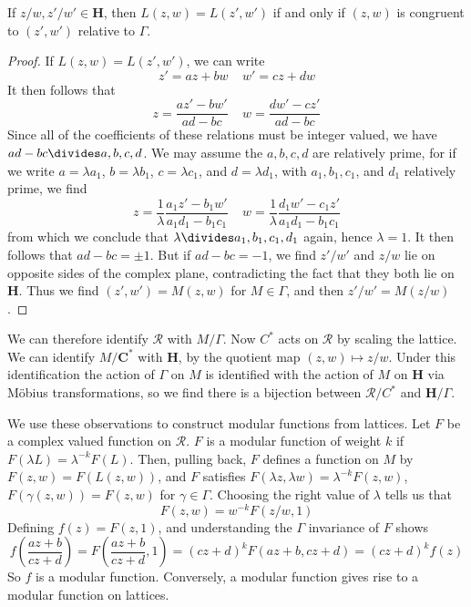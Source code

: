 \begin{theorem}
    If $z/w, z'/w' \in \mathbf{H}$, then $L(z,w) = L(z',w')$ if and only if $(z,w)$ is congruent to $(z',w')$ relative to $\Gamma$.
\end{theorem}
\begin{proof}
    If $L(z,w) = L(z',w')$, we can write
    \[ z' = az + bw\ \ \ \ \ w' = cz + dw \]
    It then follows that
    \[ z = \frac{az' - bw'}{ad - bc}\ \ \ \ \ w = \frac{dw' - cz'}{ad-bc} \]
    Since all of the coefficients of these relations must be integer valued, we have $ad - bc \divides a,b,c,d$. We may assume the $a,b,c,d$ are relatively prime, for if we write $a = \lambda a_1$, $b = \lambda b_1$, $c = \lambda c_1$, and $d = \lambda d_1$, with $a_1, b_1, c_1$, and $d_1$ relatively prime, we find
    \[ z = \frac{1}{\lambda} \frac{a_1 z' - b_1 w'}{a_1 d_1 - b_1 c_1} \ \ \ \ \ w =  \frac{1}{\lambda} \frac{d_1 w' - c_1 z'}{a_1 d_1 - b_1 c_1} \]
    from which we conclude that $\lambda \divides a_1, b_1, c_1, d_1$ again, hence $\lambda = 1$. It then follows that $ad - bc = \pm 1$. But if $ad - bc = -1$, we find $z'/w'$ and $z/w$ lie on opposite sides of the complex plane, contradicting the fact that they both lie on $\mathbf{H}$. Thus we find $(z',w') = M(z,w)$ for $M \in \Gamma$, and then $z'/w' = M(z/w)$.
\end{proof}

We can therefore identify $\mathcal{R}$ with $M/\Gamma$. Now $C^*$ acts on $\mathcal{R}$ by scaling the lattice. We can identify $M/\mathbf{C}^*$ with $\mathbf{H}$, by the quotient map $(z,w) \mapsto z/w$. Under this identification the action of $\Gamma$ on $M$ is identified with the action of $M$ on $\mathbf{H}$ via M\"{o}bius transformations, so we find there is a bijection between $\mathcal{R}/C^*$ and $\mathbf{H}/\Gamma$.

We use these observations to construct modular functions from lattices. Let $F$ be a complex valued function on $\mathcal{R}$. $F$ is a modular function of weight $k$ if $F(\lambda L) = \lambda^{-k} F(L)$. Then, pulling back, $F$ defines a function on $M$ by $F(z,w) = F(L(z,w))$, and $F$ satisfies $F(\lambda z, \lambda w) = \lambda^{-k} F(z,w)$, $F(\gamma (z,w)) = F(z,w)$ for $\gamma \in \Gamma$. Choosing the right value of $\lambda$ tells us that
%
\[ F(z,w) = w^{-k} F(z/w, 1) \]
%
Defining $f(z) = F(z,1)$, and understanding the $\Gamma$ invariance of $F$ shows
%
\[ f \left( \frac{az + b}{cz + d} \right) = F \left( \frac{az + b}{cz + d}, 1 \right) = (cz + d)^k F(az + b, cz + d) = (cz + d)^k f(z) \]
%
So $f$ is a modular function. Conversely, a modular function gives rise to a modular function on lattices.

